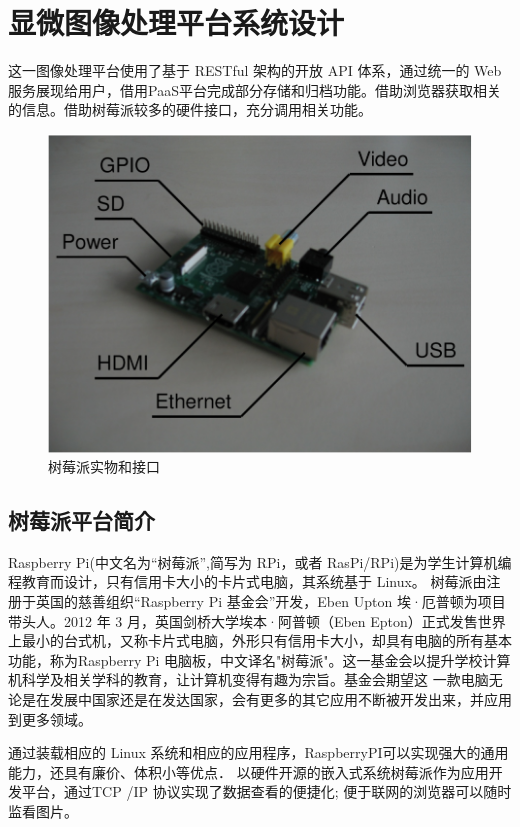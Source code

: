 \chapter{显微图像处理平台系统设计}
%
这一图像处理平台使用了基于 RESTful 架构的开放 API 体系，通过统一的 Web 服务展现给用户，借用PaaS平台完成部分存储和归档功能。借助浏览器获取相关的信息。借助树莓派较多的硬件接口，充分调用相关功能\cite{restful}。

\begin{figure}[h]
\centering
\includegraphics[width=0.7\linewidth]{Figure/rasp_1}
\caption{树莓派实物和接口}
\label{fig:rasp_3}
\end{figure}


\section{树莓派平台简介}
Raspberry Pi(中文名为“树莓派”,简写为 RPi，或者 RasPi/RPi)是为学生计算机编程教育而设计，只有信用卡大小的卡片式电脑，其系统基于 Linux。
树莓派由注册于英国的慈善组织“Raspberry Pi 基金会”开发，Eben Upton 埃·厄普顿为项目带头人。2012 年 3 月，英国剑桥大学埃本·阿普顿（Eben Epton）正式发售世界上最小的台式机，又称卡片式电脑，外形只有信用卡大小，却具有电脑的所有基本功能，称为Raspberry Pi 电脑板，中文译名"树莓派"。这一基金会以提升学校计算机科学及相关学科的教育，让计算机变得有趣为宗旨。基金会期望这 一款电脑无论是在发展中国家还是在发达国家，会有更多的其它应用不断被开发出来，并应用到更多领域\cite{raspHDMI}\cite{rasphome}。

通过装载相应的 Linux 系统和相应的应用程序，RaspberryPI可以实现强大的通用能力，还具有廉价、体积小等优点． 以硬件开源的嵌入式系统树莓派作为应用开发平台，通过TCP /IP 协议实现了数据查看的便捷化; 便于联网的浏览器可以随时监看图片。


